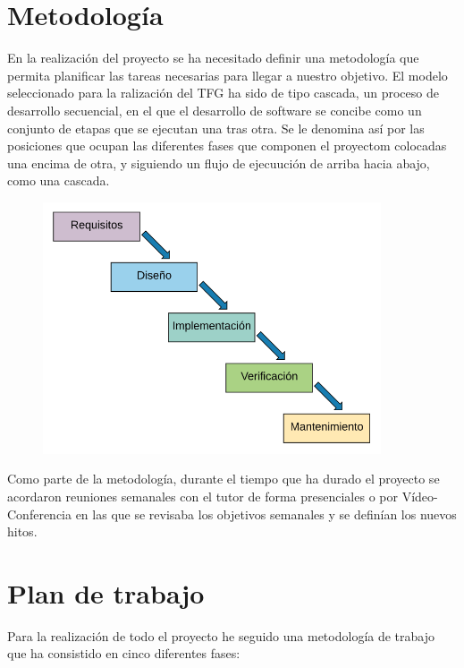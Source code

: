 \section{Metodología}
En la realización del proyecto se ha necesitado definir una metodología que permita planificar las tareas necesarias para llegar a nuestro objetivo. El modelo seleccionado para la ralización del TFG ha sido de tipo cascada, un proceso de desarrollo secuencial, en el que el desarrollo de software se concibe como un conjunto de etapas que se ejecutan una tras otra. Se le denomina así por las posiciones que ocupan las diferentes fases que componen el proyectom colocadas una encima de otra, y siguiendo un flujo de ejecuución de arriba hacia abajo, como una cascada.


\begin{figure}[H]
    \centering
    \includegraphics[width=100mm]{memoria/LaTeX/img/objetivos/cascada.png}
\end{figure}

Como parte de la metodología, durante el tiempo que ha durado el proyecto se acordaron reuniones semanales con el tutor de forma presenciales o por Vídeo-Conferencia en las que se revisaba los objetivos semanales y se definían los nuevos hitos.

\section{Plan de trabajo}

Para la realización de todo el proyecto he seguido una metodología de trabajo que ha consistido en cinco diferentes fases:


